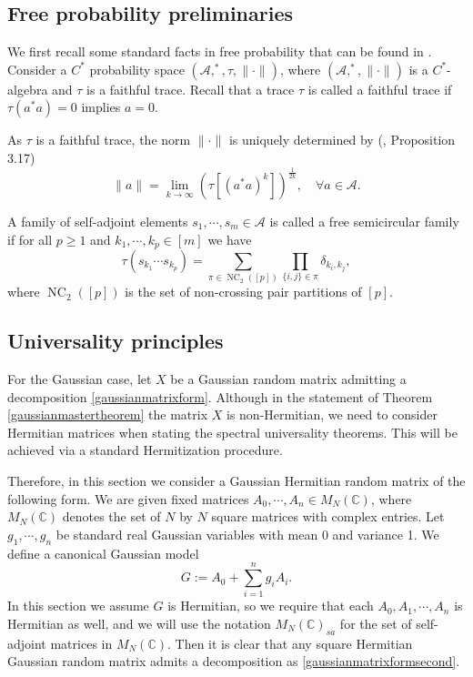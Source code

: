 \documentclass[11pt,reqno]{amsart}
\theoremstyle{plain}
\theoremstyle{remark}
\numberwithin{equation}{section}
\begin{document}
\subsection{Free probability preliminaries}
We first recall some standard facts in free probability that can be found in \cite{nica2006lectures}.
Consider a $C^*$ probability space $(\mathcal{A},^*,\tau,\|\cdot\|)$, where $(\mathcal{A},^*,\|\cdot\|)$ is a $C^*$-algebra and $\tau$ is a faithful trace. Recall that a trace $\tau$ is called a faithful trace if $\tau(a^*a)=0$ implies $a=0$.

As $\tau$ is a faithful trace, the norm $\|\cdot\|$ is uniquely determined by (\cite{nica2006lectures}, Proposition 3.17)
\begin{equation}
    \|a\|=\lim_{k\to\infty}(\tau[(a^*a)^k])^\frac{1}{2k},\quad \forall a\in\mathcal{A}.
\end{equation}


A family of self-adjoint elements $s_1,\cdots,s_m\in\mathcal{A}$ is called a free semicircular family if for all $p\geq 1$ and $k_1,\cdots,k_p\in [m]$ we have
$$
\tau(s_{k_1}\cdots s_{k_p}) =\sum_{\pi\in\operatorname{NC}_2([p])}\prod_{\{i,j\}\in\pi }\delta_{k_i,k_j},
$$
where $\operatorname{NC}_2([p])$ is the set of non-crossing pair partitions of $[p]$. 



\subsection{Universality principles}
\label{universalityprinciple}



For the Gaussian case, let $X$ be a Gaussian random matrix admitting a decomposition \eqref{gaussianmatrixform}. Although in the statement of Theorem \ref{gaussianmastertheorem} the matrix $X$ is non-Hermitian, we need to consider Hermitian matrices when stating the spectral universality theorems. This will be achieved via a standard Hermitization procedure. 


Therefore, in this section we consider a Gaussian Hermitian random matrix of the following form. We are given fixed matrices $A_0,\cdots,A_n\in M_N(\mathbb{C})$, where $M_N(\mathbb{C})$ denotes the set of $N$ by $N$ square matrices with complex entries. Let $g_1,\cdots,g_n$ be standard real Gaussian variables with mean 0 and variance 1. We define a canonical Gaussian model \begin{equation}\label{gaussianmatrixformsecond}
    G:=A_0+\sum_{i=1}^n g_i A_i. 
\end{equation}
In this section we assume $G$ is Hermitian, so we require that each $A_0,A_1,\cdots,A_n$ is Hermitian as well, and we will use the notation $M_N(\mathbb{C})_{sa}$ for the set of self-adjoint matrices in $M_N(\mathbb{C})$. Then it is clear that any square Hermitian Gaussian random matrix admits a decomposition as \eqref{gaussianmatrixformsecond}. 
\end{document}
